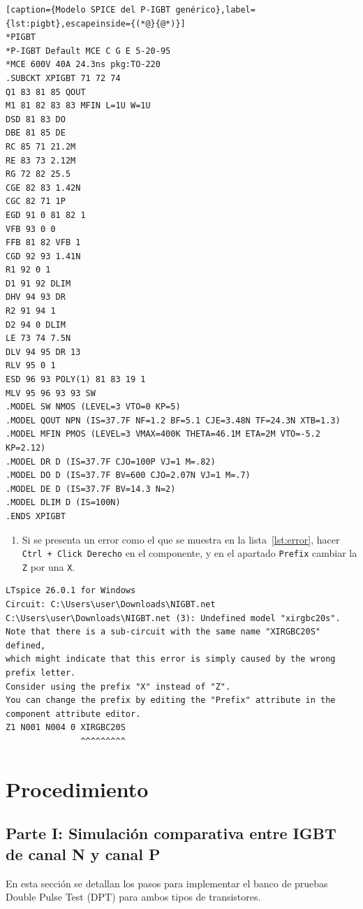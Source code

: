 \documentclass[12pt,a4paper]{article}
\begin{document}
\begin{lstlisting}[caption={Modelo SPICE del P-IGBT genérico},label={lst:pigbt},escapeinside={(*@}{@*)}]
*PIGBT
*P-IGBT Default MCE C G E 5-20-95
*MCE 600V 40A 24.3ns pkg:TO-220
.SUBCKT XPIGBT 71 72 74
Q1 83 81 85 QOUT
M1 81 82 83 83 MFIN L=1U W=1U
DSD 81 83 DO
DBE 81 85 DE
RC 85 71 21.2M
RE 83 73 2.12M
RG 72 82 25.5
CGE 82 83 1.42N
CGC 82 71 1P
EGD 91 0 81 82 1
VFB 93 0 0
FFB 81 82 VFB 1
CGD 92 93 1.41N
R1 92 0 1
D1 91 92 DLIM
DHV 94 93 DR
R2 91 94 1
D2 94 0 DLIM
LE 73 74 7.5N
DLV 94 95 DR 13
RLV 95 0 1
ESD 96 93 POLY(1) 81 83 19 1
MLV 95 96 93 93 SW
.MODEL SW NMOS (LEVEL=3 VTO=0 KP=5)
.MODEL QOUT NPN (IS=37.7F NF=1.2 BF=5.1 CJE=3.48N TF=24.3N XTB=1.3)
.MODEL MFIN PMOS (LEVEL=3 VMAX=400K THETA=46.1M ETA=2M VTO=-5.2 KP=2.12)
.MODEL DR D (IS=37.7F CJO=100P VJ=1 M=.82)
.MODEL DO D (IS=37.7F BV=600 CJO=2.07N VJ=1 M=.7)
.MODEL DE D (IS=37.7F BV=14.3 N=2)
.MODEL DLIM D (IS=100N)
.ENDS XPIGBT
\end{lstlisting}

\begin{enumerate}[resume]
  \item Si se presenta un error como el que se muestra en la
        lista~\ref{lst:error}, hacer \texttt{Ctrl + Click Derecho} en el
        componente, y en el apartado \texttt{Prefix} cambiar la \texttt{Z}
        por una \texttt{X}.
\end{enumerate}

\begin{lstlisting}[caption={Error de Prefijo},label={lst:error}]
LTspice 26.0.1 for Windows
Circuit: C:\Users\user\Downloads\NIGBT.net
C:\Users\user\Downloads\NIGBT.net (3): Undefined model "xirgbc20s".
Note that there is a sub-circuit with the same name "XIRGBC20S" defined,
which might indicate that this error is simply caused by the wrong prefix letter.
Consider using the prefix "X" instead of "Z".
You can change the prefix by editing the "Prefix" attribute in the component attribute editor.
Z1 N001 N004 0 XIRGBC20S
               ^^^^^^^^^
\end{lstlisting}

\section{Procedimiento}

\subsection{Parte I: Simulación comparativa entre IGBT de canal N y canal P}
En esta sección se detallan los pasos para implementar el banco de pruebas
Double Pulse Test (DPT) para ambos tipos de transistores.
\end{document}

